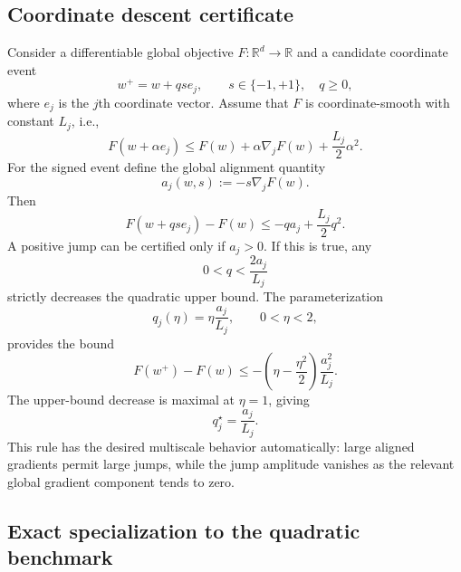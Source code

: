 \subsection{Coordinate descent certificate}

Consider a differentiable global objective $F:\mathbb{R}^d\rightarrow\mathbb{R}$ and a candidate coordinate event
\begin{equation}
  w^+=w+q s e_j,
  \qquad s\in\{-1,+1\},\quad q\geq0,
\end{equation}
where $e_j$ is the $j$th coordinate vector. Assume that $F$ is coordinate-smooth with constant $L_j$, i.e.,
\begin{equation}
  F(w+\alpha e_j)
  \leq
  F(w)+\alpha\nabla_jF(w)+\frac{L_j}{2}\alpha^2.
\end{equation}
For the signed event define the global alignment quantity
\begin{equation}
  a_j(w,s):=-s\nabla_jF(w).
\end{equation}
Then
\begin{equation}
  F(w+qse_j)-F(w)
  \leq
  -q a_j+\frac{L_j}{2}q^2.
  \label{eq:11a-descent-bound}
\end{equation}
A positive jump can be certified only if $a_j>0$. If this is true, any
\begin{equation}
  0<q<\frac{2a_j}{L_j}
\end{equation}
strictly decreases the quadratic upper bound. The parameterization
\begin{equation}
  q_j(\eta)=\eta\frac{a_j}{L_j},
  \qquad 0<\eta<2,
  \label{eq:11a-oracle-q}
\end{equation}
provides the bound
\begin{equation}
  F(w^+)-F(w)
  \leq
  -\left(\eta-\frac{\eta^2}{2}\right)\frac{a_j^2}{L_j}.
\end{equation}
The upper-bound decrease is maximal at $\eta=1$, giving
\begin{equation}
  q_j^\star=\frac{a_j}{L_j}.
\end{equation}
This rule has the desired multiscale behavior automatically: large aligned gradients permit large jumps, while the jump amplitude vanishes as the relevant global gradient component tends to zero.

\subsection{Exact specialization to the quadratic benchmark}

